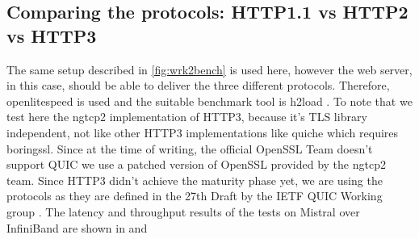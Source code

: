 \documentclass[runningheads]{llncs}
\begin{document}
\subsection{Comparing the protocols: HTTP1.1 vs HTTP2 vs HTTP3}
The same setup described in \cref{fig:wrk2bench} is used here, however the web server, in this case, should be able to deliver the three different protocols. Therefore, openlitespeed \cite{openlitespeed} is used and the suitable benchmark tool is h2load \cite{h2load}.
To note that we test here the ngtcp2 \cite{ngtcp2} implementation of HTTP3, because it's TLS library independent, not like other HTTP3 implementations like quiche \cite{quiche} which requires boringssl. Since at the time of writing, the official OpenSSL Team doesn’t support QUIC \cite{opensslquicblog} we use a patched version of OpenSSL provided by the ngtcp2 team.
Since HTTP3 didn't achieve the maturity phase yet, we are using the protocols as they are defined in the 27th Draft by the IETF QUIC Working group \cite{quicwg}.
The latency and throughput results of the tests on Mistral over InfiniBand are shown in  and 
\end{document}
